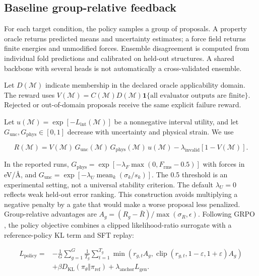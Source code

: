 \documentclass[11pt,a4paper]{article}
\begin{document}
\FloatBarrier
\subsection{Baseline group-relative
feedback}\label{baseline-group-relative-feedback}

For each target condition, the policy samples a group of proposals. A
property oracle returns predicted means and uncertainty estimates; a
force field returns finite energies and unmodified forces. Ensemble
disagreement is computed from individual fold predictions and calibrated
on held-out structures. A shared backbone with several heads is not
automatically a cross-validated ensemble.

Let \(D(\mathcal M)\) indicate membership in the declared oracle
applicability domain. The reward uses
\(V(\mathcal M)=C(\mathcal M)D(\mathcal M)\mathbf1\{\text{all evaluator outputs are finite}\}\).
Rejected or out-of-domain proposals receive the same explicit failure
reward.

Let \(u(\mathcal M)=\exp[-L_{\mathrm{int}}(\mathcal M)]\) be a
nonnegative interval utility, and let
\(G_{\mathrm{unc}},G_{\mathrm{phys}}\in[0,1]\) decrease with uncertainty
and physical strain. We use

\[
R(\mathcal M)=V(\mathcal M)\,G_{\mathrm{unc}}(\mathcal M)\,G_{\mathrm{phys}}(\mathcal M)\,u(\mathcal M)
-\lambda_{\mathrm{invalid}}[1-V(\mathcal M)].
\]

In the reported runs,
\(G_{\mathrm{phys}}=\exp[-\lambda_F\max(0,F_{\mathrm{rms}}-0.5)]\) with
forces in eV/Å, and
\(G_{\mathrm{unc}}=\exp[-\lambda_U\operatorname{mean}_k(\sigma_k/s_k)]\).
The 0.5 threshold is an experimental setting, not a universal stability
criterion. The default \(\lambda_U=0\) reflects weak held-out error
ranking. This construction avoids multiplying a negative penalty by a
gate that would make a worse proposal less penalized. Group-relative
advantages are \(A_g=(R_g-\bar R)/\max(\sigma_R,\epsilon)\). Following
GRPO \citep{shao2024grpo}, the policy objective combines a clipped
likelihood-ratio surrogate with a reference-policy KL term and SFT
replay:

\[
\begin{aligned}
L_{\mathrm{policy}}={}&-\frac1G\sum_{g=1}^{G}\frac1{T_g}\sum_{t=1}^{T_g}
\min\!\left(r_{g,t}A_g,\operatorname{clip}(r_{g,t},1-\varepsilon,1+\varepsilon)A_g\right)\\
&+\beta D_{\mathrm{KL}}(\pi_\theta\Vert\pi_{\mathrm{ref}})+\lambda_{\mathrm{anchor}}L_{\mathrm{gen}}.
\end{aligned}
\]
\end{document}
